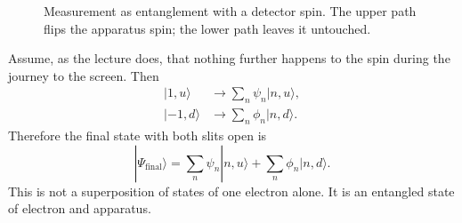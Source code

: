 \begin{figure}[htbp]
\centering
{}
\caption{Measurement as entanglement with a detector spin. The upper path flips the apparatus spin; the lower path leaves it untouched.}
\end{figure}

Assume, as the lecture does, that nothing further happens to the spin during the journey to the screen. Then
\begin{align}
|1,u\rangle &\longrightarrow \sum_n \psi_n |n,u\rangle, \\
|-1,d\rangle &\longrightarrow \sum_n \phi_n |n,d\rangle.
\end{align}
Therefore the final state with both slits open is
\begin{equation}
|\Psi_{\mathrm{final}}\rangle
  = \sum_n \psi_n |n,u\rangle + \sum_n \phi_n |n,d\rangle.
\end{equation}
This is not a superposition of states of one electron alone. It is an entangled state of electron and apparatus.


